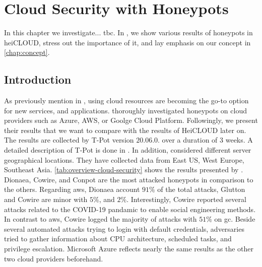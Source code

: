 \chapter{Cloud Security with Honeypots}

In this chapter we investigate... tbc.
In , we show various results of honeypots in heiCLOUD, stress out the importance of it, and lay emphasis on our concept in \autoref{chap:concept}.

\section{Introduction}

As previously mention in , using cloud resources are becoming the go-to option for new services, and applications.
\citet{Kelly2021} thoroughly investigated honeypots on cloud providers such as Azure, AWS, or Goolge Cloud Platform.
Followingly, we present their results that we want to compare with the results of HeiCLOUD later on.
The results are collected by T-Pot version $20.06.0.$ over a duration of 3 weeks.
A detailed description of T-Pot is done in .
In addition, \citet{Kelly2021} considered different server geographical locations.
They have collected data from East US, West Europe, Southeast Asia.
\autoref{tab:overview-cloud-security} shows the results presented by \citet{Kelly2021}.
Dionaea, Cowire, and Conpot are the most attacked honeypots in comparison to the others.
Regarding \ac{aws}, Dionaea account $91\%$ of the total attacks, Glutton and Cowire are minor with $5\%$, and $2\%$.
Interestingly, Cowire reported several attacks related to the COVID-19 pandamic to enable social engineering methods.
In contrast to \ac{aws}, Cowire logged the majority of attacks with $51\%$ on \ac{gc}.
Beside several automated attacks trying to login with default credentials, adversaries tried to gather information about CPU architecture, scheduled tasks, and privilege escalation.
Microsoft Azure reflects nearly the same results as the other two cloud providers beforehand.

